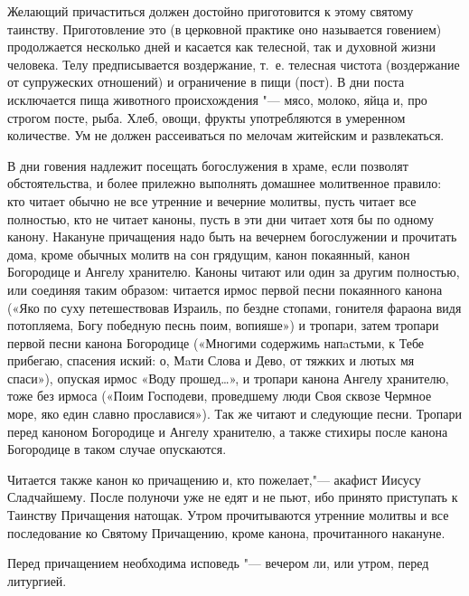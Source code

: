 \myparsep[0.25]

\medskip Желающий причаститься должен достойно приготовится к этому святому таинству. Приготовление это (в церковной практике оно называется говением) продолжается несколько дней и касается как телесной, так и духовной жизни человека. Телу предписывается воздержание, т.~е. телесная чистота (воздержание от супружеских отношений) и ограничение в пищи (пост). В дни поста исключается пища животного происхождения "--- мясо, молоко, яйца и, про строгом посте, рыба. Хлеб, овощи, фрукты употребляются в умеренном количестве. Ум не должен рассеиваться по мелочам житейским и развлекаться.

В дни говения надлежит посещать богослужения в храме, если позволят обстоятельства, и более прилежно выполнять домашнее молитвенное правило: кто читает обычно не все утренние и вечерние молитвы, пусть читает все полностью, кто не читает каноны, пусть в эти дни читает хотя бы по одному канону. Накануне причащения надо быть на вечернем богослужении и прочитать дома, кроме обычных молитв на сон грядущим, канон покаянный, канон Богородице и Ангелу хранителю. Каноны читают или один за другим полностью, или соединяя таким образом: читается ирмос первой песни покаянного канона («Яко по суху петешествовав Израиль, по бездне стопами, гонителя фараона видя потопляема, Богу победную песнь поим, вопияше») и тропари, затем тропари первой песни канона Богородице («Многими содержимь напaстьми, к Тебе прибегаю, спасения иский: о, Мaти Слова и Дево, от тяжких и лютых мя спаси»), опуская ирмос «Воду прошед…», и тропари канона Ангелу хранителю, тоже без ирмоса («Поим Господеви, проведшему люди Своя сквозе Чермное море, яко един славно прославися»). Так же читают и следующие песни. Тропари перед каноном Богородице и Ангелу хранителю, а также стихиры после канона Богородице в таком случае опускаются.

Читается также канон ко причащению и, кто пожелает,"--- акафист Иисусу Сладчайшему. После полуночи уже не едят и не пьют, ибо принято приступать к Таинству Причащения натощак. Утром прочитываются утренние молитвы и все последование ко Святому Причащению, кроме канона, прочитанного накануне.

Перед причащением необходима исповедь "--- вечером ли, или утром, перед литургией.

\mychapterending

